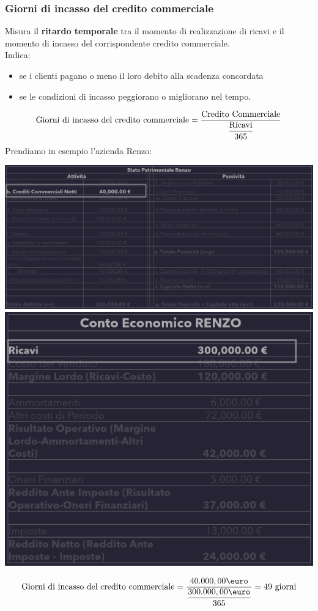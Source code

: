 \documentclass{article}
\begin{document}
\subsubsection{Giorni di incasso del credito commerciale}
Misura il \textbf{ritardo temporale} tra il momento di realizzazione di ricavi e il momento di incasso del corrispondente credito commerciale.\\
Indica:
\begin{itemize}
    \item se i clienti pagano o meno il loro debito alla scadenza concordata
    \item se le condizioni di incasso peggiorano o
    migliorano nel tempo.
\end{itemize}
\[
    \text{Giorni di incasso del credito commerciale} = \frac{\text{Credito Commerciale}}{\dfrac{\text{Ricavi}}{365}}
\]
Prendiamo in esempio l'azienda Renzo:
\begin{center}
    \includegraphics[scale=0.3]{Image/GiorniIncasso_1.png}
    \includegraphics[scale=0.3]{Image/GiorniIncasso_2.png}
\end{center}
\[
    \T{Giorni di incasso del credito commerciale} = \frac{40.000,00 \T{\euro}}{\dfrac{300.000,00\T{\euro}}{365}} = 49 \T{ giorni}
\]
\end{document}
